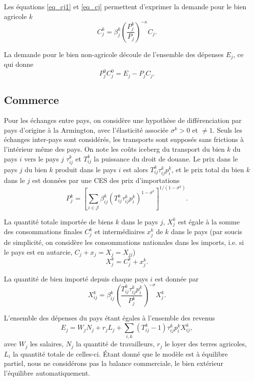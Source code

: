 Les équations \ref{eq_cj1} et \ref{eq_cj} permettent d’exprimer la demande pour le bien agricole $k$
\begin{equation}
    C_j^k = \beta_j^k \left(\frac{P_j^k}{P_j} \right)^{-\kappa} C_j.
\end{equation}

La demande pour le bien non-agricole découle de l’ensemble des dépenses $E_j$, ce qui donne
\begin{equation}
    P_j^0 C_j^0 = E_j - P_j C_j.
\end{equation}


\subsection{Commerce}

Pour les échanges entre pays, on considère une hypothèse de différenciation par pays d'origine à la Armington, avec l’élasticité associée $\sigma^k >0$ et $\neq 1$. Seuls les échanges inter-pays sont considérés, les transports sont supposés sans frictions à l’intérieur même des pays. On note les coûts iceberg du transport du bien $k$ du pays $i$ vers le pays $j$ $\tau_{ij}^k$ et $T_{ij}^k$ la puissance du droit de douane. Le prix dans le pays $j$ du bien $k$ produit dans le pays $i$ est alors $T_{ij}^k \tau_{ij}^k p_i^k$, et le prix total du bien $k$ dans le $j$ est données par une CES des prix d’importations
\begin{equation}
    P_j^k = \left[ \sum_{i \in \mathcal{J}} \beta_{ij}^k \left(T_{ij}^k \tau_{ij}^k p_i^k \right)^{1-\sigma^k} \right]^{1/(1-\sigma^k)}.
\end{equation}

La quantité totale importée de biens $k$ dans le pays $j$, $X_j^k$ est égale à la somme des consommations finales $C_j^k$ et intermédiaires $x_j^k$ de $k$ dans le pays (par soucis de simplicité, on considère les consommations nationales dans les imports, i.e. si le pays est en autarcie, $C_j + x_j = X_j = X_{jj}$)
\begin{equation}
    X_j^k = C_j^k + x_j^k.
\end{equation}

La quantité de bien importé depuis chaque pays $i$ est donnée par
\begin{equation}
    X_{ij}^k = \beta_{ij}^k \left( \frac{T_{ij}^k \tau_{ij}^k p_i^k}{P_j^k}\right)^{- \sigma} X_{j}^k.
\end{equation}

L’ensemble des dépenses du pays étant égales à l’ensemble des revenus
\begin{equation}
    E_j = W_j N_j + r_j L_j + \sum_{i,k} \left( T_{ij}^k-1 \right)\tau_{ij}^k p_i^k X_{ij}^k,
\end{equation}
avec $W_j$ les salaires, $N_j$ la quantité de travailleurs, $r_j$ le loyer des terres agricoles, $L_i$ la quantité totale de celles-ci. Étant donné que le modèle est à équilibre partiel, nous ne considérons pas la balance commerciale, le bien extérieur l'équilibre automatiquement.

